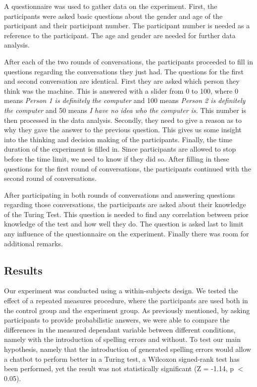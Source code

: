 A questionnaire was used to gather data on the experiment. First, the participants were asked basic questions about the gender and age of the participant and their participant number. The participant number is needed as a reference to the participant. The age and gender are needed for further data analysis.

After each of the two rounds of conversations, the participants proceeded to fill in questions regarding the conversations they just had. The questions for the first and second conversation are identical. First they are asked which person they think was the machine. This is answered with a slider from 0 to 100, where 0 means \textit{Person 1 is definitely the computer} and 100 means \textit{Person 2 is definitely the computer} and 50 means \textit{I have no idea who the computer is.} This number is then processed in the data analysis. Secondly, they need to give a reason as to why they gave the answer to the previous question. This gives us some insight into the thinking and decision making of the participants. Finally, the time duration of the experiment is filled in. Since participants are allowed to stop before the time limit, we need to know if they did so. After filling in these questions for the first round of conversations, the participants continued with the second round of conversations.

After participating in both rounds of conversations and answering questions regarding those conversations, the participants are asked about their knowledge of the Turing Test. This question is needed to find any correlation between prior knowledge of the test and how well they do. The question is asked last to limit any influence of the questionnaire on the experiment. Finally there was room for additional remarks.


\subsection{Results}
Our experiment was conducted using a within-subjects design. We tested the effect of a repeated measures procedure, where the participants are used both in the control group and the experiment group. As previously mentioned, by asking participants to provide probabilistic answers, we were able to compare the differences in the measured dependant variable between different conditions, namely with the introduction of spelling errors and without. To test our main hypothesis, namely that the introduction of generated spelling errors would allow a chatbot to perform better in a Turing test, a Wilcoxon signed-rank test has been performed, yet the result was not statistically significant (Z = -1.14, p $<$ 0.05).

